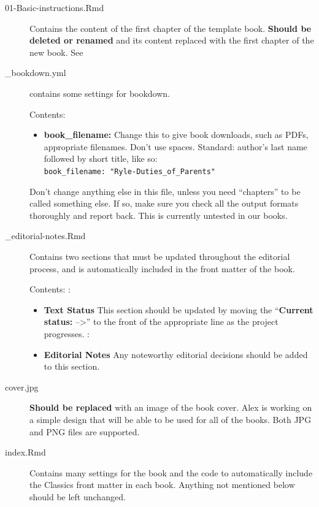 \documentclass[
]{book}
\providecommand{\tightlist}{%
  \setlength{\itemsep}{0pt}\setlength{\parskip}{0pt}}
\begin{document}
\begin{description}
\item[01-Basic-instructions.Rmd]
Contains the content of the first chapter of the template book. \textbf{Should be deleted or renamed} and its content replaced with the first chapter of the new book. See
\item[\_bookdown.yml]
contains some settings for bookdown.

Contents:

\begin{itemize}
\tightlist
\item
  \textbf{book\_filename:} Change this to give book downloads, such as PDFs, appropriate filenames. Don't use spaces. Standard: author's last name followed by short title, like so:\\
  \texttt{book\_filename:\ "Ryle-Duties\_of\_Parents"}
\end{itemize}

Don't change anything else in this file, unless you need ``chapters'' to be called something else. If so, make sure you check all the output formats thoroughly and report back. This is currently untested in our books.
\item[\_editorial-notes.Rmd]
Contains two sections that must be updated throughout the editorial process, and is automatically included in the front matter of the book.

Contents:
:

\begin{itemize}
\tightlist
\item
  \textbf{Text Status} This section should be updated by moving the ``\textbf{Current status:} --\textgreater{}'' to the front of the appropriate line as the project progresses.
  :
\end{itemize}

\begin{itemize}
\tightlist
\item
  \textbf{Editorial Notes} Any noteworthy editorial decisions should be added to this section.
\end{itemize}
\item[cover.jpg]
\textbf{Should be replaced} with an image of the book cover. Alex is working on a simple design that will be able to be used for all of the books. Both JPG and PNG files are supported.
\item[index.Rmd]
Contains many settings for the book and the code to automatically include the Classics front matter in each book. Anything not mentioned below should be left unchanged.


\end{description}
\end{document}
